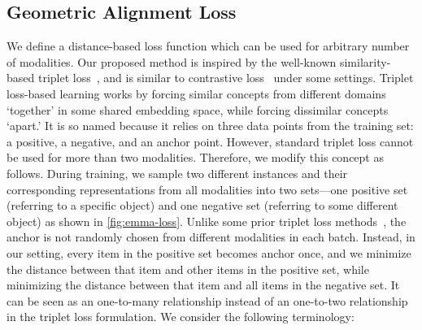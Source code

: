 \documentclass[10pt]{article} %
\newcommand{\todokdinline}[1]{\todo[color=red!20,inline]{{KD: \small #1}}}
\newcommand{\todoffinline}[1]{\todo[inline,color=blue!20]{\small #1 -- Frank}}
\begin{document}
\subsection{Geometric Alignment Loss}
\label{ssec:distanceloss}

We define a distance-based loss function which can be used for arbitrary number of modalities. Our proposed method is inspired by the well-known similarity-based triplet loss~\cite{Carvalho-cooking-triplet,triplet_loss_2021_CVPR}, and is similar to contrastive loss~\cite{chen2020simple,NEURIPS2020_supervised_contrastive} under some settings.
Triplet loss-based learning works by forcing similar concepts from different domains `together' in some shared embedding space, while forcing dissimilar concepts `apart.' It is so named because it relies on three data points from the training set: a positive, a negative, and an anchor point. 
However, standard triplet loss cannot be used for more than two modalities. Therefore, we modify this concept as follows. During training, we sample two different instances and their corresponding representations from all modalities into two sets---one positive set (referring to a specific object) and one negative set (referring to some different object) as shown in \cref{fig:emma-loss}.
Unlike some prior triplet loss methods~\cite{GoLD_UMBC,triplet_loss_2021_CVPR}, the anchor is not randomly chosen from different modalities in each batch. Instead, in our setting, every item in the positive set becomes anchor once, and we minimize the distance between that item and other items in the positive set, while minimizing the distance between that item and all items in the negative set. It can be seen as an one-to-many relationship instead of an one-to-two relationship in the triplet loss formulation.
We consider the following terminology:
\end{document}
